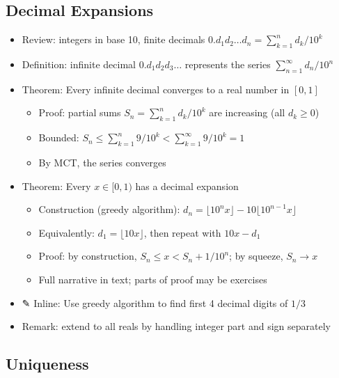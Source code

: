 \documentclass[
  10pt,
  letterpaper,
]{scrbook}
\providecommand{\tightlist}{%
  \setlength{\itemsep}{0pt}\setlength{\parskip}{0pt}}
\begin{document}
\subsection{Decimal Expansions}\label{decimal-expansions}

\begin{itemize}
\tightlist
\item
  Review: integers in base 10, finite decimals
  \(0.d_1d_2\ldots d_n = \sum_{k=1}^{n} d_k/10^k\)
\item
  Definition: infinite decimal \(0.d_1d_2d_3\ldots\) represents the
  series \(\sum_{n=1}^{\infty} d_n/10^n\)
\item
  Theorem: Every infinite decimal converges to a real number in
  \([0,1]\)

  \begin{itemize}
  \tightlist
  \item
    Proof: partial sums \(S_n = \sum_{k=1}^{n} d_k/10^k\) are increasing
    (all \(d_k \geq 0\))
  \item
    Bounded:
    \(S_n \leq \sum_{k=1}^{n} 9/10^k < \sum_{k=1}^{\infty} 9/10^k = 1\)
  \item
    By MCT, the series converges
  \end{itemize}
\item
  Theorem: Every \(x \in [0,1)\) has a decimal expansion

  \begin{itemize}
  \tightlist
  \item
    Construction (greedy algorithm):
    \(d_n = \lfloor 10^n x \rfloor - 10\lfloor 10^{n-1} x \rfloor\)
  \item
    Equivalently: \(d_1 = \lfloor 10x \rfloor\), then repeat with
    \(10x - d_1\)
  \item
    Proof: by construction, \(S_n \leq x < S_n + 1/10^n\); by squeeze,
    \(S_n \to x\)
  \item
    Full narrative in text; parts of proof may be exercises
  \end{itemize}
\item
  ✎ Inline: Use greedy algorithm to find first 4 decimal digits of
  \(1/3\)
\item
  Remark: extend to all reals by handling integer part and sign
  separately
\end{itemize}

\subsection{Uniqueness}\label{uniqueness}
\end{document}
